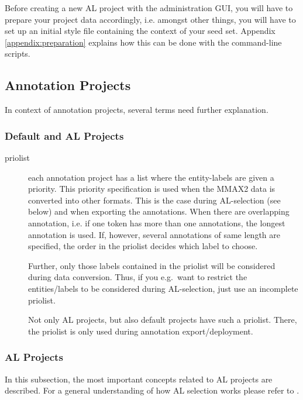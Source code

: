 \documentclass[DIV12,english,11pt,halfparskip]{scrartcl}
\begin{document}
\begin{appendix}
Before creating a new AL project with the administration GUI, you will
have to prepare your project data accordingly, i.e. amongst other
things, you will have to set up an initial style file containing the
context of your seed set. Appendix \ref{appendix:preparation} explains
how this can be done with the command-line scripts.


\subsection{Annotation Projects}

In context of annotation projects, several terms need further
explanation.

\subsubsection{Default and AL Projects}

\begin{description}
\item[priolist] each annotation project has a list where the
  entity-labels are given a priority. This priority specification is
  used when the MMAX2 data is converted into other formats. This is
  the case during AL-selection (see below) and when exporting the
  annotations. When there are overlapping annotation, i.e. if one
  token has more than one annotations, the longest annotation is used.
  If, however, several annotations of same length are specified, the
  order in the priolist decides which label to choose.

  Further, only those labels contained in the priolist will be
  considered during data conversion. Thus, if you e.g.\ want to
  restrict the entities/labels to be considered during AL-selection,
  just use an incomplete priolist.

  Not only AL projects, but also default projects have such a
  priolist. There, the priolist is only used during annotation
  export/deployment.
\end{description}




\subsubsection{AL Projects}

In this subsection, the most important concepts related to AL projects
are described. For a general understanding of how AL selection works
please refer to \cite{tomanek.thesis10}.


\end{appendix}
\end{document}
